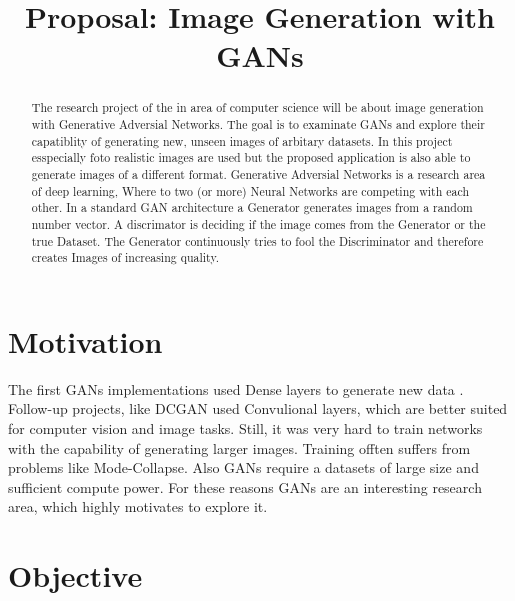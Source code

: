 \documentclass[conference,onecolumn,compsoc]{IEEEtran}
\begin{document}
\title{Proposal: Image Generation with GANs}

\author{
}
\maketitle

\begin{abstract}

\noindent
The research project of the in area of computer science will be about image generation with Generative Adversial Networks. The goal is to examinate GANs and explore their capatiblity of generating new, unseen images of arbitary datasets. In this project esspecially foto realistic images are used but the proposed application is also able to generate images of a different format. Generative Adversial Networks is a research area of deep learning, Where to two (or more) Neural Networks are competing with each other. In a standard GAN architecture a Generator generates images from a random number vector. A discrimator is deciding if the image comes from the Generator or the true Dataset. The Generator continuously tries to fool the Discriminator and therefore creates Images of increasing quality.

\end{abstract}


\section{Motivation}

\noindent
The first GANs implementations used Dense layers to generate new data \cite{goodfellow2014generative}. Follow-up projects, like DCGAN \cite{radford2016unsupervised} used Convulional layers, which are better suited for computer vision and image tasks. Still, it was very hard to train networks with the capability of generating larger images. Training offten suffers from problems like Mode-Collapse. Also GANs require a datasets of large size and sufficient compute power. For these reasons GANs are an interesting research area, which highly motivates to explore it.

\section{Objective}
\end{document}
